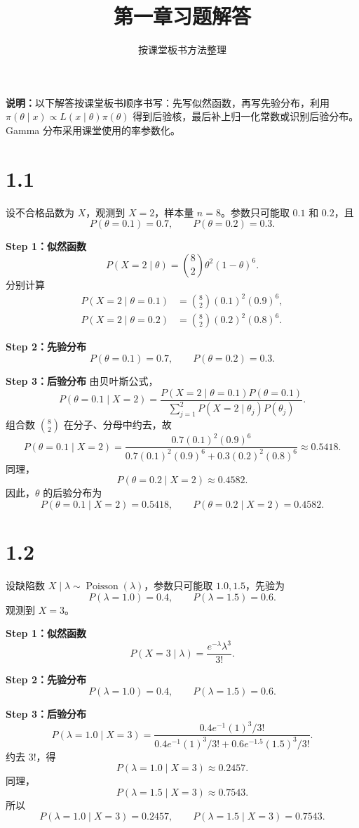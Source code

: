 \documentclass[UTF8,zihao=-4]{ctexart}
\title{第一章习题解答}
\author{按课堂板书方法整理}
\date{}
\begin{document}
\maketitle
\noindent\textbf{说明：}以下解答按课堂板书顺序书写：先写似然函数，再写先验分布，利用
\(\pi(\theta\mid x)\propto L(x\mid\theta)\pi(\theta)\) 得到后验核，最后补上归一化常数或识别后验分布。Gamma 分布采用课堂使用的率参数化。

\section*{1.1}
设不合格品数为 \(X\)，观测到 \(X=2\)，样本量 \(n=8\)。参数只可能取 \(0.1\) 和 \(0.2\)，且
\[
P(\theta=0.1)=0.7,\qquad P(\theta=0.2)=0.3.
\]

\textbf{Step 1：似然函数}
\[
P(X=2\mid\theta)={8\choose2}\theta^2(1-\theta)^6.
\]
分别计算
\[
\begin{aligned}
P(X=2\mid\theta=0.1)&={8\choose2}(0.1)^2(0.9)^6,\\
P(X=2\mid\theta=0.2)&={8\choose2}(0.2)^2(0.8)^6.
\end{aligned}
\]

\textbf{Step 2：先验分布}
\[
P(\theta=0.1)=0.7,\qquad P(\theta=0.2)=0.3.
\]

\textbf{Step 3：后验分布}
由贝叶斯公式，
\[
P(\theta=0.1\mid X=2)
=\frac{P(X=2\mid\theta=0.1)P(\theta=0.1)}
{\sum_{j=1}^2P(X=2\mid\theta_j)P(\theta_j)}.
\]
组合数 \({8\choose2}\) 在分子、分母中约去，故
\[
P(\theta=0.1\mid X=2)
=\frac{0.7(0.1)^2(0.9)^6}
{0.7(0.1)^2(0.9)^6+0.3(0.2)^2(0.8)^6}
\approx0.5418.
\]
同理，
\[
P(\theta=0.2\mid X=2)\approx0.4582.
\]
因此，\(\theta\) 的后验分布为
\[
\boxed{P(\theta=0.1\mid X=2)=0.5418,\qquad
P(\theta=0.2\mid X=2)=0.4582.}
\]

\section*{1.2}
设缺陷数 \(X\mid\lambda\sim\operatorname{Poisson}(\lambda)\)，参数只可能取 \(1.0,1.5\)，先验为
\[
P(\lambda=1.0)=0.4,\qquad P(\lambda=1.5)=0.6.
\]
观测到 \(X=3\)。

\textbf{Step 1：似然函数}
\[
P(X=3\mid\lambda)=\frac{e^{-\lambda}\lambda^3}{3!}.
\]

\textbf{Step 2：先验分布}
\[
P(\lambda=1.0)=0.4,\qquad P(\lambda=1.5)=0.6.
\]

\textbf{Step 3：后验分布}
\[
P(\lambda=1.0\mid X=3)
=\frac{0.4e^{-1}(1)^3/3!}
{0.4e^{-1}(1)^3/3!+0.6e^{-1.5}(1.5)^3/3!}.
\]
约去 \(3!\)，得
\[
P(\lambda=1.0\mid X=3)\approx0.2457.
\]
同理，
\[
P(\lambda=1.5\mid X=3)\approx0.7543.
\]
所以
\[
\boxed{P(\lambda=1.0\mid X=3)=0.2457,\qquad
P(\lambda=1.5\mid X=3)=0.7543.}
\]
\end{document}
